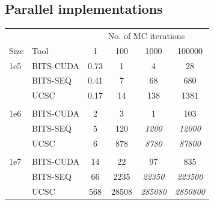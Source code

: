 \documentclass{bioinfo}
\begin{document}


        \subsection{Parallel implementations}

        \centering
        \begin{center}
            \begin{tabular}{l l c c c c}
            \multicolumn{2}{c}{} & \multicolumn{4}{c}{No. of MC iterations} \\
            \cline{3-6}
            Size & Tool & 1 & 100 & 1000 & 100000 \\
            \hline
            \hline
            1e5 & BITS-CUDA & 0.73 & 1  & 4   & 28 \\
                & BITS-SEQ  & 0.41 & 7  & 68  & 680 \\
                & UCSC      & 0.17 & 14 & 138 & 1381 \\
            \\
            1e6 & BITS-CUDA & 2 & 3    & 1       & 103 \\
                & BITS-SEQ  & 5 & 120  & \emph{1200} & \emph{12000} \\
                & UCSC      & 6 & 878  & \emph{8780} & \emph{87800} \\
            \\
            1e7 & BITS-CUDA & 14  & 22    & 97            & 835 \\
                & BITS-SEQ  & 66  & 2235  & \emph{22350}  & \emph{223500} \\
                & UCSC      & 568 & 28508 & \emph{285080} & \emph{2850800} \\
            
            \hline
            \end{tabular}
        \end{center}
        \label{table:avge}
        
\end{document}
